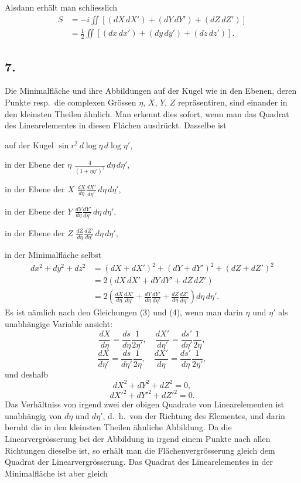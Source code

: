 \documentclass[12pt,a4paper]{article}
\begin{document}
\newpage
Alsdann erh\"alt man schliesslich
\begin{equation}\tag{5}
\begin{aligned}
S &= -i \iint \left[(dX\, dX') + (dY\, dY') + (dZ\, dZ')\right] \\
&= \tfrac{1}{2} \iint \left[(dx\, dx') + (dy\, dy') + (dz\, dz')\right].
\end{aligned}
\end{equation}

\subsection*{7.}

Die Minimalfl\"ache und ihre Abbildungen auf der Kugel wie in den Ebenen, deren Punkte resp.\ die complexen Gr\"ossen $\eta$, $X$, $Y$, $Z$ repr\"asentiren, sind einander in den kleinsten Theilen \"ahnlich. Man erkennt dies sofort, wenn man das Quadrat des Linearelementes in diesen Fl\"achen ausdr\"uckt. Dasselbe ist

auf der Kugel $\sin r^{2}\, d\log\eta\, d\log\eta'$,

in der Ebene der $\eta$ $\frac{4}{(1+\eta\eta')^{2}}\, d\eta\, d\eta'$,

in der Ebene der $X$ $\frac{dX}{d\eta} \frac{dX'}{d\eta'}\, d\eta\, d\eta'$,

in der Ebene der $Y$ $\frac{dY}{d\eta} \frac{dY'}{d\eta'}\, d\eta\, d\eta'$,

in der Ebene der $Z$ $\frac{dZ}{d\eta} \frac{dZ'}{d\eta'}\, d\eta\, d\eta'$,

in der Minimalfl\"ache selbst
\[\begin{aligned}
dx^{2} + dy^{2} + dz^{2} &= (dX+dX')^{2} + (dY+dY')^{2} + (dZ+dZ')^{2} \\
&= 2(dX\, dX' + dY\, dY' + dZ\, dZ') \\
&= 2\left(\frac{dX}{d\eta} \frac{dX'}{d\eta'} + \frac{dY}{d\eta} \frac{dY'}{d\eta'} + \frac{dZ}{d\eta} \frac{dZ'}{d\eta'}\right) d\eta\, d\eta'.
\end{aligned}\]
Es ist n\"amlich nach den Gleichungen (3) und (4), wenn man darin $\eta$ und $\eta'$ als unabh\"angige Variable ansieht:
\[\frac{dX}{d\eta} = \frac{ds}{d\eta} \frac{1}{2\eta'}, \quad \frac{dX'}{d\eta'} = \frac{ds'}{d\eta'} \frac{1}{2\eta},\]
\[\frac{dX}{d\eta'} = \frac{ds}{d\eta'} \frac{1}{2\eta}, \quad \frac{dX'}{d\eta} = \frac{ds'}{d\eta} \frac{1}{2\eta'},\]
und deshalb
\[dX^{2} + dY^{2} + dZ^{2} = 0,\]
\[dX'^{2} + dY'^{2} + dZ'^{2} = 0.\]
Das Verh\"altniss von irgend zwei der obigen Quadrate von Linearelementen ist unabh\"angig von $d\eta$ und $d\eta'$, d.\ h.\ von der Richtung des Elementes, und darin beruht die in den kleinsten Theilen \"ahnliche Abbildung. Da die Linearvergr\"osserung bei der Abbildung in irgend einem Punkte nach allen Richtungen dieselbe ist, so erh\"alt man die Fl\"achenvergr\"osserung gleich dem Quadrat der Linearvergr\"osserung. Das Quadrat des Linearelementes in der Minimalfl\"ache ist aber gleich
\end{document}
